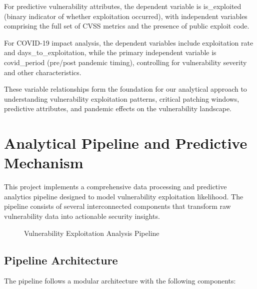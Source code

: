 \documentclass[runningheads]{llncs}
\begin{document}
For predictive vulnerability attributes, the dependent variable is is\_exploited (binary indicator of whether exploitation occurred), with independent variables comprising the full set of CVSS metrics and the presence of public exploit code.

For COVID-19 impact analysis, the dependent variables include exploitation rate and days\_to\_exploitation, while the primary independent variable is covid\_period (pre/post pandemic timing), controlling for vulnerability severity and other characteristics.

These variable relationships form the foundation for our analytical approach to understanding vulnerability exploitation patterns, critical patching windows, predictive attributes, and pandemic effects on the vulnerability landscape.

\section{Analytical Pipeline and Predictive Mechanism}
\label{sec:predictive_mechanism}

This project implements a comprehensive data processing and predictive analytics pipeline designed to model vulnerability exploitation likelihood. The pipeline consists of several interconnected components that transform raw vulnerability data into actionable security insights.

\begin{figure}[htbp]
\caption{Vulnerability Exploitation Analysis Pipeline}
\label{fig:pipeline}
\end{figure}

\subsection{Pipeline Architecture}
The pipeline follows a modular architecture with the following components:
\end{document}
